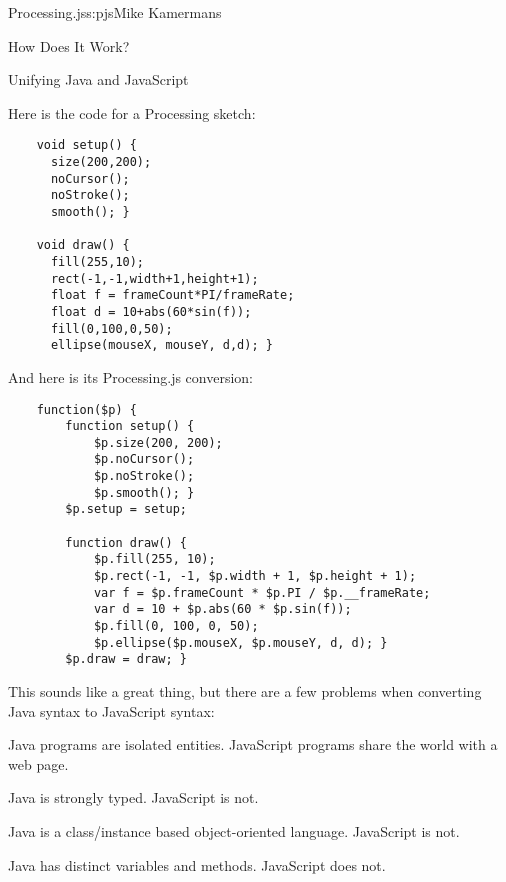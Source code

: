 \begin{aosachapter}{Processing.js}{s:pjs}{Mike Kamermans}
\begin{aosasect1}{How Does It Work?}
\begin{aosasect2}{Unifying Java and JavaScript}

Here is the code for a Processing sketch:

\begin{verbatim}
    void setup() {
      size(200,200);
      noCursor();
      noStroke();
      smooth(); }

    void draw() {
      fill(255,10);
      rect(-1,-1,width+1,height+1);
      float f = frameCount*PI/frameRate;
      float d = 10+abs(60*sin(f));
      fill(0,100,0,50);
      ellipse(mouseX, mouseY, d,d); }
\end{verbatim}

\newpage %

And here is its Processing.js conversion:

\begin{verbatim}
    function($p) {
        function setup() {
            $p.size(200, 200);
            $p.noCursor();
            $p.noStroke();
            $p.smooth(); }
        $p.setup = setup;

        function draw() {
            $p.fill(255, 10);
            $p.rect(-1, -1, $p.width + 1, $p.height + 1);
            var f = $p.frameCount * $p.PI / $p.__frameRate;
            var d = 10 + $p.abs(60 * $p.sin(f));
            $p.fill(0, 100, 0, 50);
            $p.ellipse($p.mouseX, $p.mouseY, d, d); }
        $p.draw = draw; }
     \end{verbatim}

This sounds like a great thing, but there are a few problems when
converting Java syntax to JavaScript syntax:

\begin{aosaenumerate}

\item Java programs are isolated entities. JavaScript programs share
  the world with a web page.

\item Java is strongly typed. JavaScript is not.

\item Java is a class/instance based object-oriented language. JavaScript is not.

\item Java has distinct variables and methods. JavaScript does not.


\end{aosaenumerate}
\end{aosasect2}
\end{aosasect1}
\end{aosachapter}
